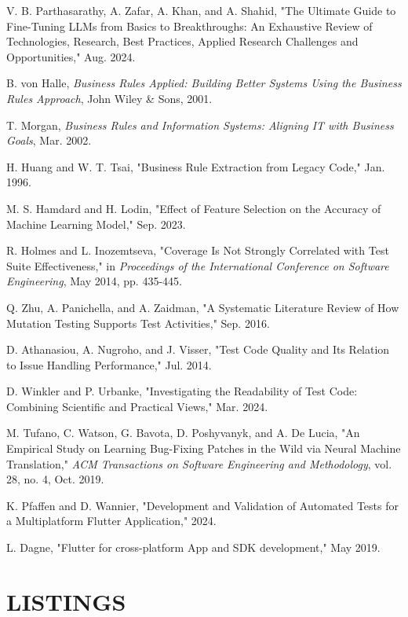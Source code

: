 \documentclass[12pt, twoside]{report}
\makeatletter
\newcommand\AppendixName{Appendix}
\let\oldappendix\appendix
\renewcommand{\appendix}{%
  \oldappendix
  \renewcommand{\chaptername}{\AppendixName}  \renewcommand{\thechapter}{\@Alph\c@chapter}}
\makeatother
\begin{document}
\begin{thebibliography}{99}
V. B. Parthasarathy, A. Zafar, A. Khan, and A. Shahid, "The Ultimate Guide to Fine-Tuning LLMs from Basics to Breakthroughs: An Exhaustive Review of Technologies, Research, Best Practices, Applied Research Challenges and Opportunities," Aug. 2024.

B. von Halle, \textit{Business Rules Applied: Building Better Systems Using the Business Rules Approach}, John Wiley \& Sons, 2001.

T. Morgan, \textit{Business Rules and Information Systems: Aligning IT with Business Goals}, Mar. 2002.

H. Huang and W. T. Tsai, "Business Rule Extraction from Legacy Code," Jan. 1996.

M. S. Hamdard and H. Lodin, "Effect of Feature Selection on the Accuracy of Machine Learning Model," Sep. 2023.

R. Holmes and L. Inozemtseva, "Coverage Is Not Strongly Correlated with Test Suite Effectiveness," in \textit{Proceedings of the International Conference on Software Engineering}, May 2014, pp. 435-445.

Q. Zhu, A. Panichella, and A. Zaidman, "A Systematic Literature Review of How Mutation Testing Supports Test Activities," Sep. 2016.

D. Athanasiou, A. Nugroho, and J. Visser, "Test Code Quality and Its Relation to Issue Handling Performance," Jul. 2014.

D. Winkler and P. Urbanke, "Investigating the Readability of Test Code: Combining Scientific and Practical Views," Mar. 2024.

M. Tufano, C. Watson, G. Bavota, D. Poshyvanyk, and A. De Lucia, "An Empirical Study on Learning Bug-Fixing Patches in the Wild via Neural Machine Translation," \textit{ACM Transactions on Software Engineering and Methodology}, vol. 28, no. 4, Oct. 2019.

K. Pfaffen and D. Wannier, "Development and Validation of Automated Tests for a Multiplatform Flutter Application," 2024.

L. Dagne, "Flutter for cross-platform App and SDK development," May 2019.

\end{thebibliography}

\appendix
\chapter{LISTINGS}

\end{document}
